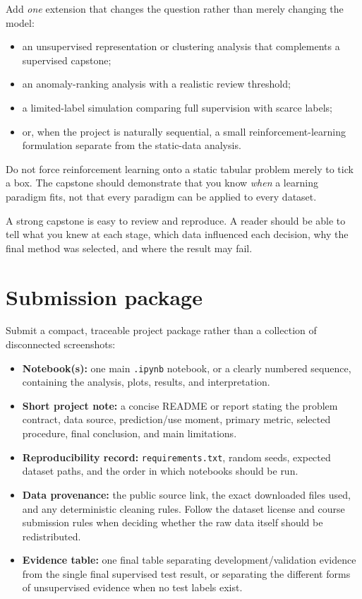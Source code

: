 Add \emph{one} extension that changes the question rather than merely changing the model:
\begin{itemize}
  \item an unsupervised representation or clustering analysis that complements a supervised capstone;
  \item an anomaly-ranking analysis with a realistic review threshold;
  \item a limited-label simulation comparing full supervision with scarce labels;
  \item or, when the project is naturally sequential, a small reinforcement-learning formulation separate from the static-data analysis.
\end{itemize}

Do not force reinforcement learning onto a static tabular problem merely to tick a box. The capstone should demonstrate that you know \emph{when} a learning paradigm fits, not that every paradigm can be applied to every dataset.

\begin{keyidea}
A strong capstone is easy to review and reproduce. A reader should be able to tell what you knew at each stage, which data influenced each decision, why the final method was selected, and where the result may fail.
\end{keyidea}

\section*{Submission package}

Submit a compact, traceable project package rather than a collection of disconnected screenshots:

\begin{itemize}
  \item \textbf{Notebook(s):} one main \texttt{.ipynb} notebook, or a clearly numbered sequence, containing the analysis, plots, results, and interpretation.
  \item \textbf{Short project note:} a concise README or report stating the problem contract, data source, prediction/use moment, primary metric, selected procedure, final conclusion, and main limitations.
  \item \textbf{Reproducibility record:} \texttt{requirements.txt}, random seeds, expected dataset paths, and the order in which notebooks should be run.
  \item \textbf{Data provenance:} the public source link, the exact downloaded files used, and any deterministic cleaning rules. Follow the dataset license and course submission rules when deciding whether the raw data itself should be redistributed.
  \item \textbf{Evidence table:} one final table separating development/validation evidence from the single final supervised test result, or separating the different forms of unsupervised evidence when no test labels exist.
\end{itemize}

